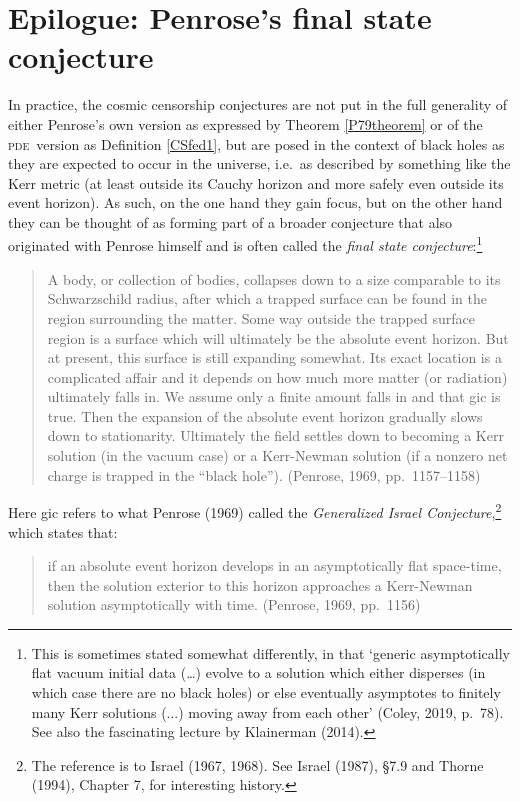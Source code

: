 \documentclass[11pt,a4paper]{article}
\newcommand{\pde}{\textsc{pde}}
\begin{document}
\section{Epilogue: Penrose's final state conjecture}\label{FSC}
In practice, the cosmic censorship conjectures are not put in the full  generality of either Penrose's own version as expressed by Theorem \ref{P79theorem} or of the \pde\ version as Definition \ref{CSfed1}, 
but are posed in the context of black holes as they are expected to occur in the universe, i.e.\ as described by something like the Kerr metric (at least outside its Cauchy horizon and more safely even outside its event horizon). As such, on the one hand
 they gain focus, but on the other hand they can be thought of as
 forming part of a broader  conjecture that also originated with Penrose himself and is often called the \emph{final state conjecture}:\footnote{This is sometimes stated somewhat differently, in that `generic asymptotically  flat vacuum initial data (\ldots) evolve to a solution which either disperses (in which case there are no black holes) or else eventually asymptotes to
  finitely many Kerr solutions (...) moving away from each other' (Coley, 2019, p.\ 78). See also the fascinating lecture by Klainerman (2014).
  }
 \begin{quote}
\begin{small}A body, or collection of bodies, collapses down to a size comparable to its Schwarzschild radius, after which a trapped surface can be found in the region surrounding the matter. Some way outside the trapped surface region is a surface which will ultimately be the absolute event horizon. But at present, this surface is still expanding somewhat. Its exact location is a complicated affair and it depends on how much more matter (or radiation) ultimately falls in. We assume only a finite amount falls in and that {\sc gic} is true. Then the expansion of the absolute event horizon gradually slows down to stationarity. Ultimately the field settles down to becoming a Kerr solution (in
the vacuum case) or a Kerr-Newman solution (if a nonzero net charge is trapped in the ``black hole''). (Penrose, 1969, pp.\ 1157--1158)
\end{small}
\end{quote}
Here {\sc gic} refers to what Penrose (1969) called the \emph{Generalized Israel Conjecture},\footnote{The reference is to Israel (1967, 1968). See Israel (1987), \S 7.9 and Thorne (1994), Chapter 7, for interesting history.}
which states that:
 \begin{quote}
\begin{small}
 if an absolute event horizon develops in an asymptotically flat space-time, then the solution exterior to this horizon approaches a Kerr-Newman solution asymptotically with time. (Penrose, 1969, pp.\ 1156)
\end{small}
\end{quote}
\end{document}
